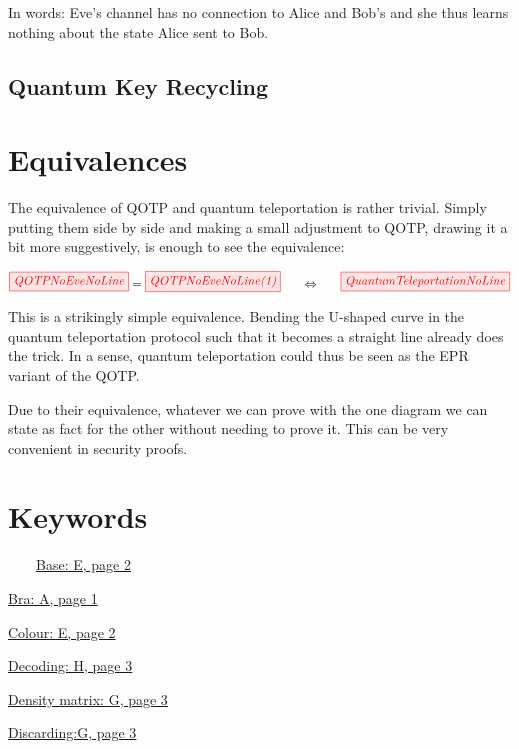 \documentclass[]{article}
\begin{document}
In words: Eve's channel has no connection to Alice and Bob's and she thus learns nothing about the state Alice sent to Bob.


\subsection{Quantum Key Recycling}




\section{Equivalences}
\label{Equivalences}

The equivalence of QOTP and quantum teleportation is rather trivial. Simply putting them side by side and making a small adjustment to QOTP, drawing it a bit more suggestively, is enough to see the equivalence:

\begin{equation}
\tikzfig{QOTPNoEveNoLine} = \tikzfig{QOTPNoEveNoLine(1)}~~~~~ \Leftrightarrow ~~~~~\tikzfig{QuantumTeleportationNoLine}
\end{equation}

This is a strikingly simple equivalence. Bending the U-shaped curve in the quantum teleportation protocol such that it becomes a straight line already does the trick. In a sense, quantum teleportation could thus be seen as the EPR variant of the QOTP. 

Due to their equivalence, whatever we can prove with the one diagram we can state as fact for the other without needing to prove it. This can be very convenient in security proofs.






\appendix


\section{Keywords}
\label{Keywords}


~~~~\hyperref[coloursandbases]{Base: E, page 2}

\hyperref[braandket]{Bra: A, page 1}

\hyperref[coloursandbases]{Colour: E, page 2}

\hyperref[phasespiders]{Decoding: H, page 3}

\hyperref[discarding]{Density matrix: G, page 3}

\hyperref[discarding]{Discarding:G, page 3}
\end{document}
